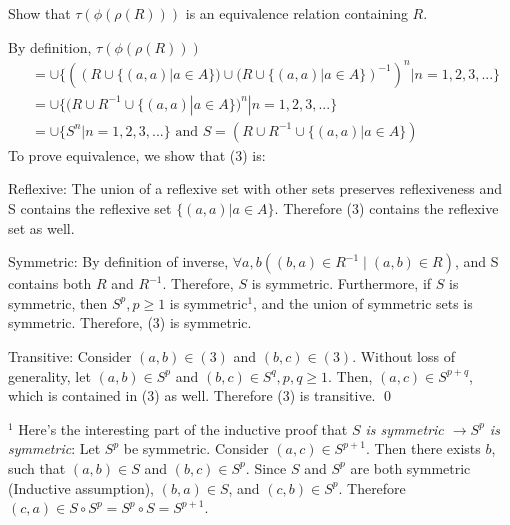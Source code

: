 \documentclass[addpoints]{exam}
\begin{document}
\begin{questions}
    Show that $\tau (\phi (\rho (R)))$ is an equivalence relation containing $R$.
    
      \begin{solution}
    By definition, $\tau (\phi (\rho (R)))$ 
    \begin{align}
    &= \cup\{((R \cup \{(a,a) | a \in A\}) \cup (R \cup \{(a,a) | a \in A\})^{-1})^n | n = 1,2,3,...\}\\
    &= \cup\{(R \cup R^{-1} \cup \{(a,a) | a \in A\})^n | n = 1,2,3,...\}\\
    &= \cup\{S^n | n=1,2,3,...\} \text{ and } S=(R \cup R^{-1} \cup \{(a,a) | a \in A\}) 
    \end{align}
    To prove equivalence, we show that (3) is:
        \begin{subparts}
        \subpart Reflexive: The union of a reflexive set with other sets preserves reflexiveness and S contains the reflexive set $\{(a,a) | a \in A\}$. Therefore (3) contains the reflexive set as well.
         
        \subpart Symmetric: By definition of inverse, $\forall a,b ((b,a) \in R^{-1}\;|\;(a,b) \in R)$, and S contains both $R$ and $R^{-1}$. Therefore, $S$ is symmetric. Furthermore, if $S$ is symmetric, then $S^p, p \geq 1$ is symmetric$^1$, and the union of symmetric sets is symmetric. Therefore, (3) is symmetric. 
        
        \subpart Transitive: Consider $(a,b) \in (3)$ and $(b,c) \in (3)$. Without loss of generality, let $(a,b) \in S^p$ and $(b,c) \in S^q, p,q \geq 1$. Then, $(a,c) \in S^{p+q}$, which is contained in (3) as well. Therefore (3) is transitive.
        \qed 
        
        \end{subparts}
        $^1$ Here's the interesting part of the inductive proof that \textit{$S$ is symmetric $\rightarrow S^p$ is symmetric}: Let $S^p$ be symmetric. Consider $(a,c) \in S^{p+1}$. Then there exists $b$, such that $(a,b) \in S$ and $(b,c) \in S^p$. Since $S$ and $S^p$ are both symmetric (Inductive assumption), $(b,a) \in S$, and $(c,b) \in S^p$. Therefore $(c,a) \in S \circ S^p = S^p \circ S = S^{p+1}$. 
  \end{solution}


\end{questions}
\end{document}
